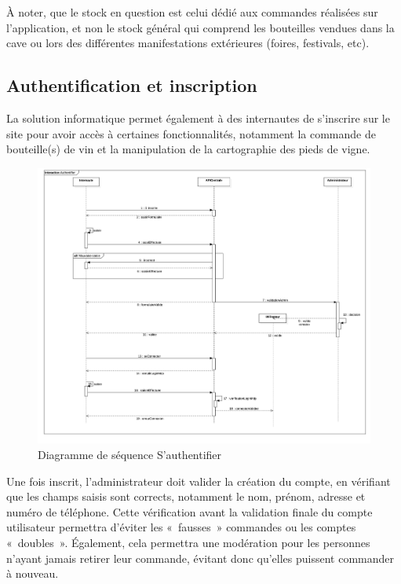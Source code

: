\documentclass[a4paper, titlepage]{report}
\begin{document}
À noter, que le stock en question est celui dédié aux commandes
réalisées sur l'application, et non le stock général qui comprend les
bouteilles vendues dans la cave ou lors des différentes manifestations
extérieures (foires, festivals, etc).

\subsection{Authentification et inscription}

La solution informatique permet également à des internautes de
s'inscrire sur le site pour avoir accès à certaines fonctionnalités,
notamment la commande de bouteille(s) de vin et la manipulation de la
cartographie des pieds de vigne.

\begin{figure}[!h]
\centering
\includegraphics{Images/SequenceDiagramAuthentifier.jpg}
\caption{Diagramme de séquence S'authentifier}
\end{figure}

Une fois inscrit, l'administrateur doit valider la création du compte,
en vérifiant que les champs saisis sont corrects, notamment le nom,
prénom, adresse et numéro de téléphone. Cette vérification avant la
validation finale du compte utilisateur permettra d'éviter les
«~fausses~» commandes ou les comptes «~doubles~». Également, cela
permettra une modération pour les personnes n'ayant jamais retirer leur
commande, évitant donc qu'elles puissent commander à nouveau.
\end{document}
